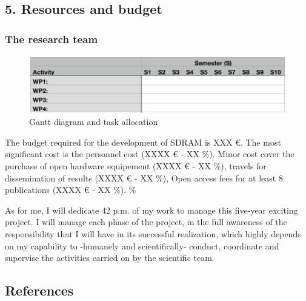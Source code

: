 \documentclass[
  11pt,
  a4paperpaper,
  onecolumn]{article}
\begin{document}
\hypertarget{resources-and-budget}{%
\subsection{5. Resources and budget}\label{resources-and-budget}}

\hypertarget{the-research-team}{%
\subsubsection{The research team}\label{the-research-team}}

\begin{figure}
\centering
    \includegraphics[width=0.9\linewidth]{Gantt/Gantt-B1.pdf}
    \caption{Gantt diagram and task allocation}
    \label{fig:gantt-b1}
\end{figure}

The budget required for the development of SDRAM is XXX €. The most
significant cost is the personnel cost (XXXX € - XX \%). Minor cost
cover the purchase of open hardware equipement (XXXX € - XX \%), travels
for dissemination of results (XXXX € - XX \%), Open access fees for at
least 8 publications (XXXX € - XX \%). \%

As for me, I will dedicate 42 p.m. of my work to manage this five-year
exciting project. I will manage each phase of the project, in the full
awareness of the responsibility that I will have in its successful
realization, which highly depends on my capability to -humanely and
scientifically- conduct, coordinate and supervise the activities carried
on by the scientific team.

\newpage

\hypertarget{references}{%
\subsection*{References}\label{references}}
\end{document}

